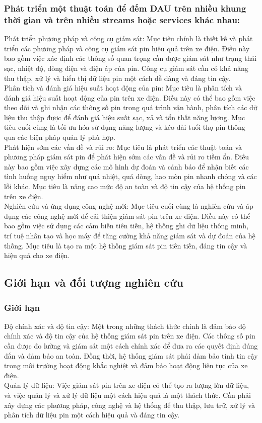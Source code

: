 \documentclass[a4paper,13pt]{article}
\theoremstyle{mytheor}
\begin{document}
\subsubsection{Phát triển một thuật toán để đếm DAU trên nhiều khung thời gian và trên nhiều streams hoặc services khác nhau:}
Phát triển phương pháp và công cụ giám sát: Mục tiêu chính là thiết kế và phát triển các phương pháp và công cụ giám sát pin hiệu quả trên xe điện. Điều này bao gồm việc xác định các thông số quan trọng cần được giám sát như trạng thái sạc, nhiệt độ, dòng điện và điện áp của pin. Công cụ giám sát cần có khả năng thu thập, xử lý và hiển thị dữ liệu pin một cách dễ dàng và đáng tin cậy.\\
Phân tích và đánh giá hiệu suất hoạt động của pin: Mục tiêu là phân tích và đánh giá hiệu suất hoạt động của pin trên xe điện. Điều này có thể bao gồm việc theo dõi và ghi nhận các thông số pin trong quá trình vận hành, phân tích các dữ liệu thu thập được để đánh giá hiệu suất sạc, xả và tổn thất năng lượng. Mục tiêu cuối cùng là tối ưu hóa sử dụng năng lượng và kéo dài tuổi thọ pin thông qua các biện pháp quản lý phù hợp.\\
Phát hiện sớm các vấn đề và rủi ro: Mục tiêu là phát triển các thuật toán và phương pháp giám sát pin để phát hiện sớm các vấn đề và rủi ro tiềm ẩn. Điều này bao gồm việc xây dựng các mô hình dự đoán và cảnh báo để nhận biết các tình huống nguy hiểm như quá nhiệt, quá dòng, hao mòn pin nhanh chóng và các lỗi khác. Mục tiêu là nâng cao mức độ an toàn và độ tin cậy của hệ thống pin trên xe điện.\\
Nghiên cứu và ứng dụng công nghệ mới: Mục tiêu cuối cùng là nghiên cứu và áp dụng các công nghệ mới để cải thiện giám sát pin trên xe điện. Điều này có thể bao gồm việc sử dụng các cảm biến tiên tiến, hệ thống ghi dữ liệu thông minh, trí tuệ nhân tạo và học máy để tăng cường khả năng giám sát và dự đoán của hệ thống. Mục tiêu là tạo ra một hệ thống giám sát pin tiên tiến, đáng tin cậy và hiệu quả cho xe điện.

\subsection{Giới hạn và đối tượng nghiên cứu }
\subsubsection{Giới hạn}
Độ chính xác và độ tin cậy: Một trong những thách thức chính là đảm bảo độ chính xác và độ tin cậy của hệ thống giám sát pin trên xe điện. Các thông số pin cần được đo lường và giám sát một cách chính xác để đưa ra các quyết định đúng đắn và đảm bảo an toàn. Đồng thời, hệ thống giám sát phải đảm bảo tính tin cậy trong môi trường hoạt động khắc nghiệt và đảm bảo hoạt động liên tục của xe điện.\\
Quản lý dữ liệu: Việc giám sát pin trên xe điện có thể tạo ra lượng lớn dữ liệu, và việc quản lý và xử lý dữ liệu một cách hiệu quả là một thách thức. Cần phải xây dựng các phương pháp, công nghệ và hệ thống để thu thập, lưu trữ, xử lý và phân tích dữ liệu pin một cách hiệu quả và đáng tin cậy.
\end{document}
